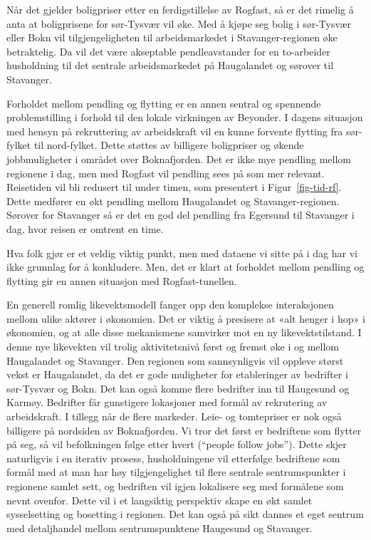 \documentclass[
]{article}
\begin{document}
Når det gjelder boligpriser etter en ferdigstillelse av Rogfast, så er
det rimelig å anta at boligprisene for sør-Tysvær vil øke. Med å kjøpe
seg bolig i sør-Tysvær eller Bokn vil tilgjengeligheten til
arbeidsmarkedet i Stavanger-regionen øke betraktelig. Da vil det være
akseptable pendleavstander for en to-arbeider husholdning til det
sentrale arbeidsmarkedet på Haugalandet og sørover til Stavanger.

Forholdet mellom pendling og flytting er en annen sentral og spennende
problemstilling i forhold til den lokale virkningen av Beyonder. I
dagens situasjon med hensyn på rekruttering av arbeidskraft vil en kunne
forvente flytting fra sør-fylket til nord-fylket. Dette støttes av
billigere boligpriser og økende jobbmuligheter i området over
Boknafjorden. Det er ikke mye pendling mellom regionene i dag, men med
Rogfast vil pendling sees på som mer relevant. Reisetiden vil bli
redusert til under timen, som presentert i Figur~\ref{fig-tid-rf}. Dette
medfører en økt pendling mellom Haugalandet og Stavanger-regionen.
Sørover for Stavanger så er det en god del pendling fra Egersund til
Stavanger i dag, hvor reisen er omtrent en time.

Hva folk gjør er et veldig viktig punkt, men med dataene vi sitte på i
dag har vi ikke grunnlag for å konkludere. Men, det er klart at
forholdet mellom pendling og flytting gir en annen situasjon med
Rogfast-tunellen.

En generell romlig likevektsmodell fanger opp den komplekse
interaksjonen mellom ulike aktører i økonomien. Det er viktig å
presisere at «alt henger i hop» i økonomien, og at alle disse
mekanismene samvirker mot en ny likevektstilstand. I denne nye
likevekten vil trolig aktivitetsnivå først og fremst øke i og mellom
Haugalandet og Stavanger. Den regionen som sannsynligvis vil oppleve
størst vekst er Haugalandet, da det er gode muligheter for etableringer
av bedrifter i sør-Tysvær og Bokn. Det kan også komme flere bedrifter
inn til Haugesund og Karmøy. Bedrifter får gunstigere lokasjoner med
formål av rekrutering av arbeidskraft. I tillegg når de flere markeder.
Leie- og tomtepriser er nok også billigere på nordsiden av Boknafjorden.
Vi tror det først er bedriftene som flytter på seg, så vil befolkningen
følge etter hvert (``people follow jobs''). Dette skjer naturligvis i en
iterativ prosess, husholdningene vil etterfølge bedriftene som formål
med at man har høy tilgjengelighet til flere sentrale sentrumspunkter i
regionene samlet sett, og bedriften vil igjen lokalisere seg med
formålene som nevnt ovenfor. Dette vil i et langsiktig perspektiv skape
en økt samlet sysselsetting og bosetting i regionen. Det kan også på
sikt dannes et eget sentrum med detaljhandel mellom sentrumspunktene
Haugesund og Stavanger.
\end{document}
